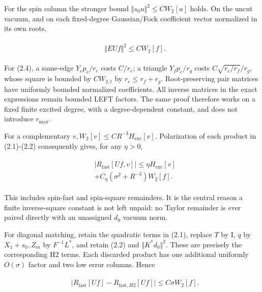 For the spin column the stronger bound
\(\Vert s_{0}u\Vert ^{2}\le CW_{2}[u]\) holds. On the uncut vacuum, and
on each fixed-degree Gaussian/Fock coefficient vector normalized in its
own roots,

\begin{gather*}
\begin{aligned}
& \Vert E U f\Vert ^{2} \le  C W_{2}[f].
\end{aligned}\tag{2.4}
\end{gather*}

For (2.4), a same-edge \(Y_{e} p_{e}/r_{e}\) costs \(C/r_{e}\); a
triangle \(Y_{f} p_{e}/r_{g}\) costs \(C \sqrt{r_{e}/r_{f}}/r_{g}\),
whose square is bounded by \(C W_{2,t}\) by \(r_{e}\le r_{f}+r_{g}\).
Root-preserving pair matrices have uniformly bounded normalized
coefficients. All inverse matrices in the exact expressions remain
bounded LEFT factors. The same proof therefore works on a fixed finite
excited degree, with a degree-dependent constant, and does not introduce
\(r_{\max}\).

For a complementary \(v, W_{2}[v]\le C R^{-3}H_{\mathrm{exc}}[v]\).
Polarization of each product in (2.1)-(2.2) consequently gives, for any
\(\eta >0\),

\begin{gather*}
\begin{aligned}
& \vert R_{\mathrm{fast}}[Uf,v]\vert  \le  \eta  H_{\mathrm{exc}}[v] \\
& +C_{\eta}(\sigma ^{2}+R^{-3}) W_{2}[f].
\end{aligned}\tag{2.5}
\end{gather*}

This includes spin-fast and spin-square remainders. It is the central
reason a finite inverse-square constant is not left unpaid: no Taylor
remainder is ever paired directly with an unassigned \(d_{0}\) vacuum
norm.

For diagonal matching, retain the quadratic terms in (2.1), replace
\(T\) by I, \(q\) by \(X_{1}+s_{0}, Z_{m}\) by \(F^{-1}L^{*}\), and
retain (2.2) and \(\Vert K^{*}d_{0}\Vert ^{2}\). These are precisely the
corresponding H2 terms. Each discarded product has one additional
uniformly \(O(\sigma )\) factor and two low error columns. Hence

\begin{gather*}
\begin{aligned}
& \vert R_{\mathrm{fast}}[Uf]-R_{\mathrm{fast},H2}[Uf]\vert  \le  C \sigma  W_{2}[f].
\end{aligned}\tag{2.6}
\end{gather*}

